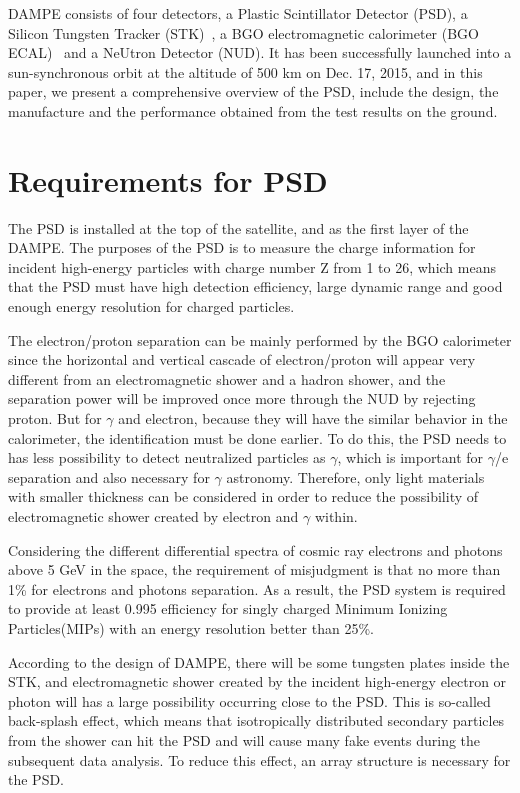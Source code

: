 \documentclass[preprint]{elsarticle}
\begin{document}
DAMPE consists of four detectors, a Plastic Scintillator Detector (PSD), a Silicon Tungsten Tracker (STK)~\cite{P.Azzarello}, a BGO electromagnetic calorimeter (BGO ECAL)~\cite{BGO_ECAL} and a NeUtron Detector (NUD). It has been successfully launched into a sun-synchronous orbit at the altitude of 500 km on Dec. 17, 2015, and in this paper, we present a comprehensive overview of the PSD, include the design, the manufacture and the performance obtained from the test results on the ground.

\section{Requirements for PSD}

The PSD is installed at the top of the satellite, and as the first layer of the DAMPE. The purposes of the PSD is to measure the charge information for incident high-energy particles with charge number Z from 1 to 26, which means that the PSD must have high detection efficiency, large dynamic range and good enough energy resolution for charged particles.

The electron/proton separation can be mainly performed by the BGO calorimeter since the horizontal and vertical cascade of electron/proton will appear very different from an electromagnetic shower and a hadron shower, and the separation power will be improved once more through the NUD by rejecting proton. But for $\gamma$ and electron, because they will have the similar behavior in the calorimeter, the identification must be done earlier. To do this, the PSD needs to has less possibility to detect neutralized particles as $\gamma$, which is important for $\gamma$/e separation and also necessary for $\gamma$ astronomy. Therefore, only light materials with smaller thickness can be considered in order to reduce the possibility of electromagnetic shower created by electron and  $\gamma$ within.

Considering the different differential spectra of cosmic ray electrons and photons above 5 GeV in the space, the requirement of misjudgment is that no more than 1\% for electrons and photons separation. As a result, the PSD system is required to provide at least 0.995 efficiency for singly charged Minimum Ionizing Particles(MIPs) with an energy resolution better than 25\%.

According to the design of DAMPE, there will be some tungsten plates inside the STK, and electromagnetic shower created by the incident high-energy electron or photon will has a large possibility occurring close to the PSD. This is so-called back-splash effect, which means that isotropically distributed secondary particles from the shower can hit the PSD and will cause many fake events during the subsequent data analysis. To reduce this effect, an array structure is necessary for the PSD.
\end{document}
